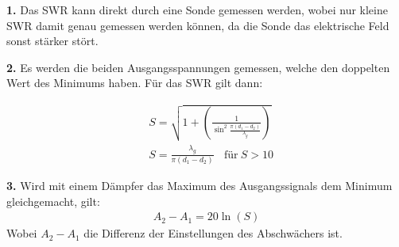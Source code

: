 \textbf{1.} Das SWR kann direkt durch eine Sonde gemessen werden, wobei nur kleine SWR
damit genau gemessen werden können, da die Sonde das elektrische Feld sonst stärker
stört.

\textbf{2.} Es werden die beiden Ausgangsspannungen gemessen, welche den doppelten Wert
des Minimums haben. Für das SWR gilt dann:

\begin{align}
  &S = \sqrt{1+  \left(\frac{1}{\sin^2{ \frac{\pi(d_1 - d_2)}{\lambda_g} }} \right) } \\
  &S = \frac{\lambda_g}{\pi(d_1-d_2)} \: \:\:\: \text{für} \:S > 10
\end{align}

\textbf{3.} Wird mit einem Dämpfer das Maximum des Ausgangssignals dem Minimum gleichgemacht, gilt:
\begin{align}
  A_2 - A_1 = 20 \ln(S)
\end{align}
Wobei $A_2 - A_1$ die Differenz der Einstellungen des Abschwächers ist.
